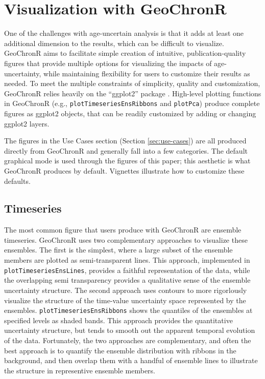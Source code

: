 \documentclass[gchron, manuscript]{copernicus}
\begin{document}
\hypertarget{sec:visualization}{%
\section{Visualization with GeoChronR}\label{sec:visualization}}

One of the challenges with age-uncertain analysis is that it adds at least one additional dimension to the results, which can be difficult to visualize.
GeoChronR aims to facilitate simple creation of intuitive, publication-quality figures that provide multiple options for visualizing the impacts of age-uncertainty, while maintaining flexibility for users to customize their results as needed.
To meet the multiple constraints of simplicity, quality and customization, GeoChronR relies heavily on the ``ggplot2'' package \citep{ggplot2}.
High-level plotting functions in GeoChronR (e.g., \texttt{plotTimeseriesEnsRibbons} and \texttt{plotPca}) produce complete figures as ggplot2 objects, that can be readily customized by adding or changing ggplot2 layers.

The figures in the Use Cases section (Section \ref{sec:use-cases}) are all produced directly from GeoChronR and generally fall into a few categories.
The default graphical mode is used through the figures of this paper; this aesthetic is what GeoChronR produces by default.
Vignettes illustrate how to customize these defaults.

\subsection{Timeseries}

The most common figure that users produce with GeoChronR are ensemble timeseries.
GeoChronR uses two complementary approaches to visualize these ensembles.
The first is the simplest, where a large subset of the ensemble members are plotted as semi-transparent lines.
This approach, implemented in \texttt{plotTimeseriesEnsLines}, provides a faithful representation of the data, while the overlapping semi transparency provides a qualitative sense of the ensemble uncertainty structure.
The second approach uses contours to more rigorlously visualize the structure of the time-value uncertainty space represented by the ensembles.
\texttt{plotTimeseriesEnsRibbons} shows the quantiles of the ensembles at specified levels as shaded bands.
This approach provides the quantitative uncertainty structure, but tends to smooth out the apparent temporal evolution of the data.
Fortunately, the two approaches are complementary, and often the best approach is to quantify the ensemble distribution with ribbons in the background, and then overlap them with a handful of ensemble lines to illustrate the structure in representive ensemble members.
\end{document}
